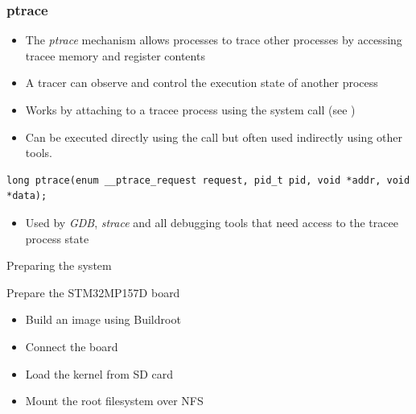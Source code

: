 \begin{frame}[fragile]
  \frametitle{ptrace}
  \begin{itemize}
    \item The {\em ptrace} mechanism allows processes to trace other processes by
          accessing tracee memory and register contents
    \item A tracer can observe and control the execution state of another
          process
    \item Works by attaching to a tracee process using the 
          system call (see )
    \item Can be executed directly using the  call but often used
          indirectly using other tools.
  \end{itemize}

  \begin{block}{}
    \begin{verbatim}
long ptrace(enum __ptrace_request request, pid_t pid, void *addr, void *data);
    \end{verbatim}
  \end{block}

  \begin{itemize}
    \item Used by {\em GDB}, {\em strace} and all debugging tools that need access to the
          tracee process state
  \end{itemize}
\end{frame}

\setuplabframe
{Preparing the system}
{
  Prepare the STM32MP157D board
  \begin{itemize}
    \item Build an image using Buildroot
    \item Connect the board
    \item Load the kernel from SD card
    \item Mount the root filesystem over NFS
  \end{itemize}
}
